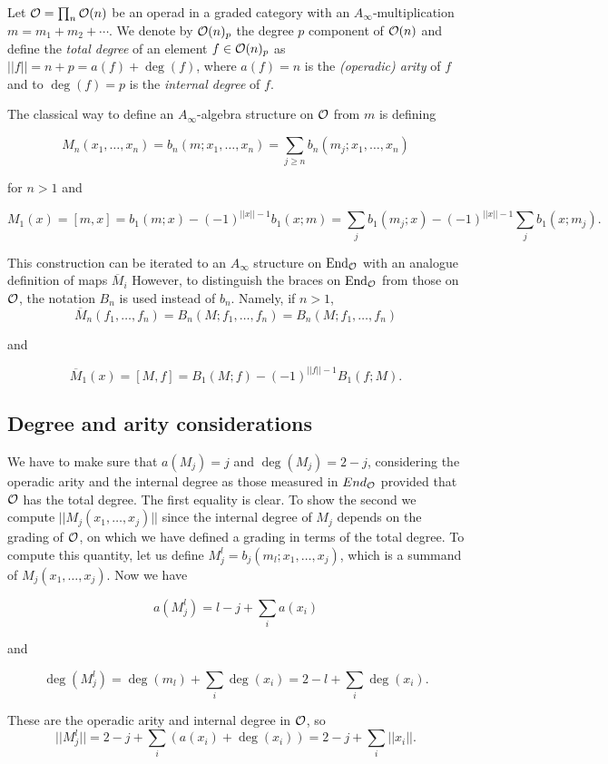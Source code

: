 \documentclass[twoside]{article}
\begin{document}
\begin{appendices}
Let $\mathcal{O}=\prod_n{\mathcal O}(n)$ be an operad in a graded category with an $A_\infty$-multiplication $m=m_1+m_2+\cdots$. We denote by ${\mathcal O}(n)_p$ the degree $p$ component of ${\mathcal O}(n)$ and define the \emph{total degree} of an element $f\in {\mathcal O}(n)_p$ as $||f||=n+p=a(f)+\deg(f)$, where $a(f)=n$ is the \emph{(operadic) arity} of $f$ and to $\deg(f)=p$ is the \emph{internal degree} of $f$. 



The classical way to define an $A_\infty$-algebra structure on ${\mathcal O}$ from $m$ is defining

$$M_n(x_1,\dots, x_n)=b_n(m;x_1,\dots, x_n)=\sum_{j\geq n}b_n(m_j;x_1,\dots, x_n)$$

for $n>1$ and 

$$M_1(x)=[m,x]=b_1(m;x)-(-1)^{||x||-1}b_1(x;m)=\sum_j b_1(m_j;x)-(-1)^{||x||-1}\sum_jb_1(x;m_j).$$ 


This construction can be iterated to an $A_\infty$ structure on $\operatorname{End}_{\mathcal O}$ with an analogue definition of maps $\overline{M}_i$ 
However, to distinguish the braces on $\operatorname{End}_{\mathcal O}$ from those on ${\mathcal O}$, the notation $B_n$ is used instead of $b_n$. Namely, if $n>1$,  
$$\overline{M}_n(f_1,\dots, f_n)=B_n(M;f_1,\dots, f_n)= B_n(M;f_1,\dots, f_n)$$

and

$$\overline{M}_1(x)=[M,f]=B_1(M;f)-(-1)^{||f||-1}B_1(f;M).$$ 

\subsection{Degree and arity considerations}

We have to make sure that $a(M_j)=j$ and $\deg(M_j)=2-j$, considering the operadic arity and the internal degree as those measured in $End_{\mathcal O}$ provided that ${\mathcal O}$ has the total degree. The first equality is clear. To show the second we compute $||M_j(x_1,\dots, x_j)||$ since the internal degree of $M_j$ depends on the grading of ${\mathcal O}$, on which we have defined a grading in terms of the total degree. To compute this quantity, let us define $M_j^l=b_j(m_l;x_1,\dots, x_j)$, which is a summand of $M_j(x_1,\dots, x_j)$. Now we have 

$$a(M_j^l)=l-j+\sum_i a(x_i)$$

and

$$\deg(M_j^l)=\deg(m_l)+\sum_i\deg(x_i)=2-l+\sum_i \deg(x_i).$$ 

These are the operadic arity and internal degree in ${\mathcal O}$, so $$||M_j^l||=2-j+\sum_i(a(x_i)+\deg(x_i))=2-j+\sum_i||x_i||.$$ 


\end{appendices}
\end{document}
